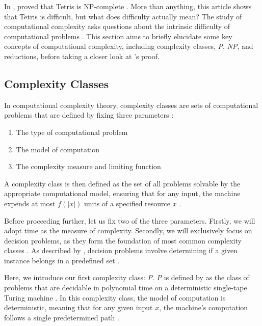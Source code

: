 \documentclass[a4paper, 12pt]{extreport}
\begin{document}
			In \citeyear{tetris-is-hard-even-to-approx}, \citeauthor{tetris-is-hard-even-to-approx} proved that Tetris is NP-complete \cite{tetris-is-hard-even-to-approx}. More than anything, this article shows that Tetris is difficult, but what does difficulty actually mean? The study of computational complexity asks questions about the intrinsic difficulty of computational problems \cite{cc:conceptual-perspective}. This section aims to briefly elucidate some key concepts of computational complexity, including complexity classes, \textit{P}, \textit{NP}, and reductions, before taking a closer look at \citeauthor{tetris-is-hard-even-to-approx}'s proof.
			
			\subsection{Complexity Classes}\label{subsec:compclass}
				
				In computational complexity theory, complexity classes are sets of computational problems that are defined by fixing three parameters \cite{cc:conceptual-perspective}:
				\begin{enumerate}
					\item The type of computational problem
					\item The model of computation
					\item The complexity measure and limiting function
				\end{enumerate}
				
				A complexity class is then defined as the set of all problems solvable by the appropriate computational model, ensuring that for any input, the machine expends at most $f(|x|)$ units of a specified resource $x$ \cite{comp-complexity-papa}.
				
				Before proceeding further, let us fix two of the three parameters. Firstly, we will adopt time as the measure of complexity. Secondly, we will exclusively focus on decision problems, as they form the foundation of most common complexity classes \cite{goldreich-p-np-np-comp}.	As described by \citeauthor{goldreich-p-np-np-comp}, decision problems involve determining if a given instance belongs in a predefined set \cite{goldreich-p-np-np-comp}.
				
				Here, we introduce our first complexity class: \textit{P}. \textit{P} is defined by \citeauthor{sipser-intro-to-computation} as the class of problems that are decidable in polynomial time on a deterministic single-tape Turing machine \cite{sipser-intro-to-computation}. In this complexity class, the model of computation is deterministic, meaning that for any given input $x$, the machine's computation follows a single predetermined path \cite{sipser-intro-to-computation}.
				
\end{document}
